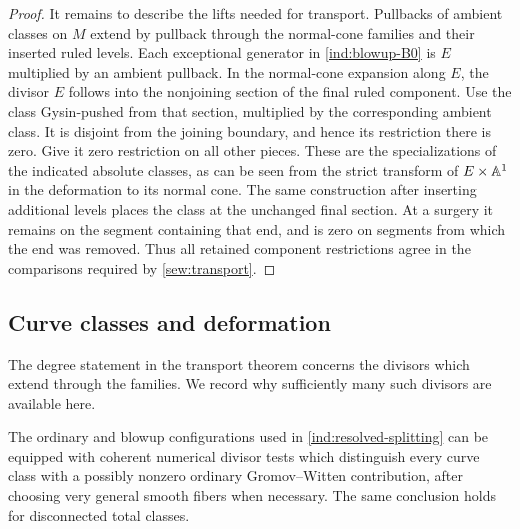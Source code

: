 \begin{proof}
It remains to describe the lifts needed for transport. Pullbacks of
ambient classes on $M$ extend by pullback through the normal-cone
families and their inserted ruled levels. Each exceptional generator
in \eqref{ind:blowup-B0} is $E$ multiplied by an ambient pullback.
In the normal-cone expansion along $E$, the divisor $E$ follows into
the nonjoining section of the final ruled component. Use the class
Gysin-pushed from that section, multiplied by the corresponding
ambient class. It is disjoint from the joining boundary, and hence its
restriction there is zero. Give it zero restriction on all other
pieces. These are the specializations of the indicated absolute
classes, as can be seen from the strict transform of
$E\times\mathbb A^1$ in the deformation to its normal cone. The same
construction after inserting additional levels places the class at
the unchanged final section. At a surgery it remains on the segment
containing that end, and is zero on segments from which the end was
removed. Thus all retained component restrictions agree in the
comparisons required by \cref{sew:transport}.
\end{proof}

\subsection{Curve classes and deformation}

The degree statement in the transport theorem concerns the divisors
which extend through the families. We record why sufficiently many
such divisors are available here.

\begin{lemma}
\label{ind:degrees}
The ordinary and blowup configurations used in
\eqref{ind:resolved-splitting} can be equipped with coherent numerical
divisor tests which distinguish every curve class with a possibly
nonzero ordinary Gromov--Witten contribution, after choosing very
general smooth fibers when necessary. The same conclusion holds for
disconnected total classes.
\end{lemma}


